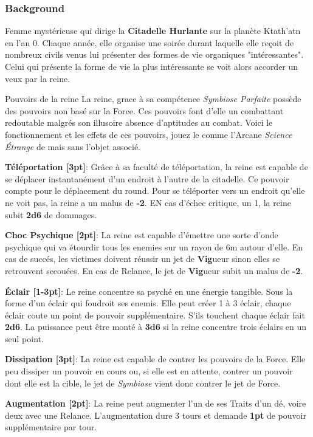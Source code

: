 \subsubsection{Background}
Femme mystérieuse qui dirige la \textbf{Citadelle Hurlante} sur la planète Ktath’atn en l’an 0. Chaque année, elle organise une soirée durant laquelle elle reçoit de nombreux civils venus lui présenter des formes de vie organiques "intéressantes". Celui qui présente la forme de vie la plus intéressante se voit alors accorder un veux par la reine.
\newpage
\begin{paperbox}{Pouvoirs de la reine}
La reine, grace à sa compétence \textit{Symbiose Parfaite} possède des pouvoirs non basé sur la Force. Ces pouvoirs font d’elle un combattant redoutable malgrés son illusoire absence d’aptitudes au combat. Voici le fonctionnement et les effets de ces pouvoirs, jouez le comme l’Arcane \textit{Science \'Etrange} de  mais sans l’objet associé.
\bigbreak
\begin{rebelist}
    \item \textbf{Téléportation [3pt]}: Grâce à sa faculté de téléportation, la reine est capable de se déplacer instantanément d’un endroit à l’autre de la citadelle. Ce pouvoir compte pour le déplacement du round. Pour se téléporter vers un endroit qu’elle ne voit pas, la reine a un malus de \textbf{-2}. EN cas d’échec critique, un 1, la reine subit \textbf{2d6} de dommages.
    \item \textbf{Choc Psychique [2pt]}: La reine est capable d’émettre une sorte d’onde psychique qui va étourdir tous les enemies sur un rayon de 6m autour d’elle. En cas de succés, les victimes doivent réussir un jet de \textbf{Vig}ueur sinon elles se retrouvent secouées. En cas de Relance, le jet de \textbf{Vig}ueur subit un malus de \textbf{-2}.
    \item \textbf{\'Eclair [1-3pt]}: Le reine concentre sa psyché en une énergie tangible. Sous la forme d’un éclair qui foudroit ses enemis. Elle peut créer 1 à 3 éclair, chaque éclair coute un point de pouvoir supplémentaire. S’ils touchent chaque éclair fait \textbf{2d6}. La puissance peut être monté à \textbf{3d6} si la reine concentre trois éclairs en un seul point.
    \item \textbf{Dissipation [3pt]}: La reine est capable de contrer les pouvoirs de la Force. Elle peu dissiper un pouvoir en cours ou, si elle est en attente, contrer un pouvoir dont elle est la cible, le jet de \textit{Symbiose} vient donc contrer le jet de Force.
    \item \textbf{Augmentation [2pt]}: La reine peut augmenter l’un de ses Traits d’un dé, voire deux avec une Relance. L’augmentation dure 3 tours et demande \textbf{1pt} de pouvoir supplémentaire par tour.
\end{rebelist}
\end{paperbox}
\newpage

